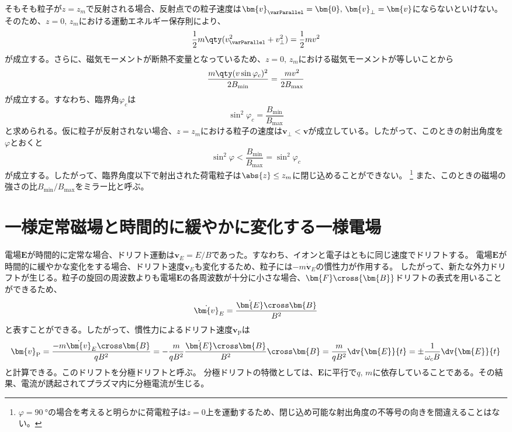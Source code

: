 そもそも粒子が$z=z_m$で反射される場合、反射点での粒子速度は$\bm{v}_{\varParallel} = \bm{0},\,\bm{v}_{\perp} = \bm{v}$にならないといけない。
そのため、$z=0,\,z_m$における運動エネルギー保存則により、
\begin{equation}
	\frac{1}{2}m\qty( v_{\varParallel}^2 + v^2_{\perp}) = \frac{1}{2}mv^2
\end{equation}
が成立する。さらに、磁気モーメントが断熱不変量となっているため、$z=0,\,z_m$における磁気モーメントが等しいことから
\begin{equation}
	\frac{m\qty(v\sin\varphi_c)^2}{2B_{\text{min}}} = \frac{mv^2}{2B_{\text{max}}}
\end{equation}
が成立する。すなわち、臨界角$\varphi_c$は
\begin{equation}
	\sin^2\varphi_c = \frac{B_{\text{min}}}{B_{\text{max}}}
\end{equation}
と求められる。仮に粒子が反射されない場合、$z=z_m$における粒子の速度は$\bm{v}_{\perp} < \bm{v}$が成立している。したがって、このときの射出角度を$\varphi$とおくと
\begin{equation}
	\sin^2\varphi < \frac{B_{\text{min}}}{B_{\text{max}}} = \sin^2\varphi_c
\end{equation}
が成立する。したがって、臨界角度以下で射出された荷電粒子は$\abs{z} \leq z_m$に閉じ込めることができない。
\footnote{$\varphi = \SI{90}{\degree}$の場合を考えると明らかに荷電粒子は$z=0$上を運動するため、閉じ込め可能な射出角度の不等号の向きを間違えることはない。}
また、このときの磁場の強さの比$B_{\text{min}}/B_{\text{max}}$をミラー比と呼ぶ。

\section{一様定常磁場と時間的に緩やかに変化する一様電場}
電場$\bm{E}$が時間的に定常な場合、ドリフト運動は$\bm{v}_E = E/B$であった。すなわち、イオンと電子はともに同じ速度でドリフトする。
電場$\bm{E}$が時間的に緩やかな変化をする場合、ドリフト速度$\bm{v}_E$も変化するため、粒子には$-m\dot{\bm{v}}_E$の慣性力が作用する。
したがって、新たな外力ドリフトが生じる。粒子の旋回の周波数よりも電場$\bm{E}$の各周波数が十分に小さな場合、$\bm{F}\cross{\bm{B}}$ドリフトの表式を用いることができるため、
\begin{equation}
	\dot{\bm{v}}_E = \frac{\dot{\bm{E}}\cross\bm{B}}{B^2}
\end{equation}
と表すことができる。したがって、慣性力によるドリフト速度$\bm{v}_\text{P}$は
\begin{equation}
	\bm{v}_\text{P} = \frac{-m\dot{\bm{v}}_E\cross\bm{B}}{qB^2} = -\frac{m}{qB^2}\frac{\dot{\bm{E}}\cross\bm{B}}{B^2}\cross\bm{B}
	= \frac{m}{qB^2}\dv{\bm{E}}{t} = \pm\frac{1}{\omega_cB}\dv{\bm{E}}{t}
\end{equation}
と計算できる。このドリフトを分極ドリフトと呼ぶ。
分極ドリフトの特徴としては、$\bm{E}$に平行で$q,\,m$に依存していることである。その結果、電流が誘起されてプラズマ内に分極電流が生じる。


